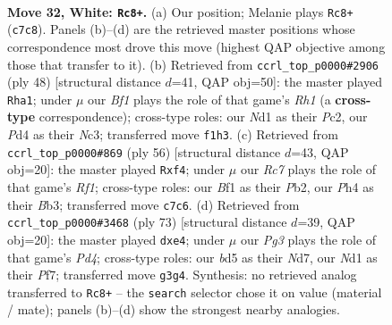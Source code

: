 \documentclass[11pt]{article}
\begin{document}
\clearpage

\begin{figure}[p]\centering
\begin{subfigure}{0.46\textwidth}\centering
\resizebox{\linewidth}{!}{%
\newchessgame
\chessboard[
  setfen={6k1/2R2pp1/4p3/1p1b3p/1r1PnP1P/4P1P1/8/3N1BK1 w - - 2 32},
  showmover=false,
  pgfstyle=straightmove, color=movearrow, markmove={c7-c8}
]}
\caption{}
\end{subfigure}\hfill
\begin{subfigure}{0.46\textwidth}\centering
\resizebox{\linewidth}{!}{%
\newchessgame
\chessboard[
  setfen={2r3k1/4bp1p/R2pp3/4n1p1/4P3/2N2P2/1PP2K2/7R w - - 1 25},
  showmover=false,
  pgfstyle=straightmove, color=movearrow, markmove={h1-a1}
]}
\caption{}
\end{subfigure}
\\[4pt]
\begin{subfigure}{0.46\textwidth}\centering
\resizebox{\linewidth}{!}{%
\newchessgame
\chessboard[
  setfen={5k1r/1p3p2/2b4p/p2p4/3Nnp2/1BP4P/PP4P1/2K2R2 w - - 4 29},
  showmover=false,
  pgfstyle=straightmove, color=movearrow, markmove={f1-f4}
]}
\caption{}
\end{subfigure}\hfill
\begin{subfigure}{0.46\textwidth}\centering
\resizebox{\linewidth}{!}{%
\newchessgame
\chessboard[
  setfen={6k1/3n1pp1/2p4p/3p4/2bPPN2/r4PP1/6BP/1R4K1 b - - 0 37},
  showmover=false,
  pgfstyle=straightmove, color=movearrow, markmove={d5-e4}
]}
\caption{}
\end{subfigure}
\caption{\textbf{Move 32, White: \texttt{Rc8+}.} (a) Our position; Melanie plays \texttt{Rc8+} (\texttt{c7c8}). Panels (b)--(d) are the retrieved master positions whose correspondence most drove this move (highest QAP objective among those that transfer to it). (b) Retrieved from \texttt{ccrl\_top\_p0000\#2906} (ply 48) [structural distance $d$=41, QAP obj=50]: the master played \texttt{Rha1}; under $\mu$ our \emph{Bf1} plays the role of that game's \emph{Rh1} (a \textbf{cross-type} correspondence); cross-type roles: our \emph{N}d1 as their \emph{P}c2, our \emph{P}d4 as their \emph{N}c3; transferred move \texttt{f1h3}. (c) Retrieved from \texttt{ccrl\_top\_p0000\#869} (ply 56) [structural distance $d$=43, QAP obj=20]: the master played \texttt{Rxf4}; under $\mu$ our \emph{Rc7} plays the role of that game's \emph{Rf1}; cross-type roles: our \emph{B}f1 as their \emph{P}b2, our \emph{P}h4 as their \emph{B}b3; transferred move \texttt{c7c6}. (d) Retrieved from \texttt{ccrl\_top\_p0000\#3468} (ply 73) [structural distance $d$=39, QAP obj=20]: the master played \texttt{dxe4}; under $\mu$ our \emph{Pg3} plays the role of that game's \emph{Pd4}; cross-type roles: our \emph{b}d5 as their \emph{N}d7, our \emph{N}d1 as their \emph{P}f7; transferred move \texttt{g3g4}. Synthesis: no retrieved analog transferred to \texttt{Rc8+} -- the \texttt{search} selector chose it on value (material / mate); panels (b)--(d) show the strongest nearby analogies.}
\label{fig:thought-m62}
\end{figure}
\end{document}
